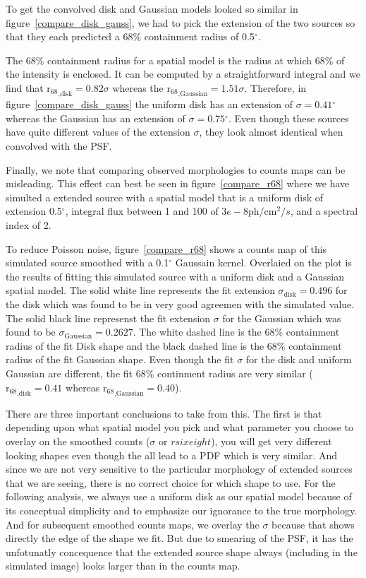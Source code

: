 \documentclass[12pt,preprint]{aastex}
\newcommand{\gev}{\text{GeV}\xspace}
\newcommand{\ph}{\text{ph}\xspace}
\newcommand{\cm}{\text{cm}\xspace}
\newcommand{\rsixeight}{{\ensuremath{\text{r}_{68}}}\xspace}
\renewcommand{\deg}{\ensuremath{^\circ}\xspace}
\begin{document}
To get the convolved disk and Gaussian models looked so similar in
figure~\ref{compare_disk_gauss}, we had to pick the extension of the two
sources so that they each predicted a 68\% containment radius of 0.5\deg.

The 68\% containment radius for a spatial model is
the radius at which 68\% of the intensity is enclosed.
It can be computed by a straightforward integral and we
find that $\rsixeight_\text{,disk}=0.82\sigma$ whereas
the $\rsixeight_\text{,Gaussian}=1.51\sigma$. Therefore, in
figure~\ref{compare_disk_gauss} the uniform disk has an extension
of $\sigma=0.41\deg$ whereas the Gaussian has an extension of
$\sigma=0.75\deg$. Even though these sources have quite different
values of the extension $\sigma$, they look almost identical when convolved
with the PSF.

Finally, we note that comparing observed morphologies to 
counts maps can be misleading.  This effect can best be seen
in figure~\ref{compare_r68} where we have simulted a
extended source with 
a spatial model that is a uniform disk of extension 0.5\deg,
integral flux between 1 \gev and 100 \gev of $3e-8\ph/\cm^2/s$,
and a spectral index of 2. 

To reduce Poisson noise, figure~\ref{compare_r68} shows a counts map of
this simulated source smoothed with a 0.1\deg Gaussain kernel.  Overlaied
on the plot is the results of fitting this simulated source with a uniform
disk and a Gaussian spatial model.  The solid white line represents the
fit extension $\sigma_\text{disk}=0.496$ for the disk which was found to
be in very good agreemen with the simulated value.  The solid black line
represenst the fit extension $\sigma$ for the Gaussian which was found to
be $\sigma_\text{Gaussian}=0.2627$.  The white dashed line is the 68\%
containment radius of the fit Disk shape and the black dashed line is
the 68\% containment radius of the fit Gaussian shape.  Even though the
fit $\sigma$ for the disk and uniform Gaussian are different, the fit
68\% continment radius are very similar ($\rsixeight_\text{,disk}=0.41$
whereas $\rsixeight_\text{,Gaussian}=0.40$).

There are three important conclusions to take from this. The first is
that depending upon what spatial model you pick and what parameter you
choose to overlay on the smoothed counts ($\sigma$ or $rsixeight$),
you will get very different looking shapes even though the all lead
to a PDF which is very similar. And since we are not very sensitive
to the particular morphology of extended sources that we are seeing,
there is no correct choice for which shape to use. For the following
analysis, we always use a uniform disk as our spatial model because
of its conceptual simplicity and to emphasize our ignorance to the
true morphology. And for subsequent smoothed counts maps, we overlay
the $\sigma$ because that shows directly the edge of the shape we fit.
But due to smearing of the PSF, it has the unfotunatly concequence that
the extended source shape always (including in the simulated image)
looks larger than in the counts map.
\end{document}
